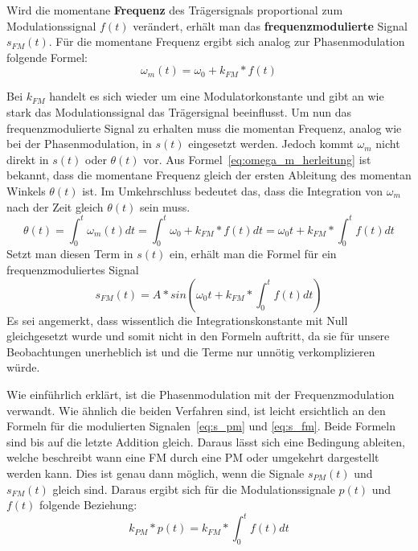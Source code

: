 Wird die momentane \textbf{Frequenz} des Trägersignals proportional zum Modulationssignal \(f(t)\) verändert, erhält man das \textbf{frequenzmodulierte} Signal \(s_{FM}(t)\). \cite[S. 210]{lathi} Für die momentane Frequenz ergibt sich analog zur Phasenmodulation folgende Formel:
\begin{equation}
\omega_m(t)=\omega_0+k_{FM}*f(t)
\label{eq:omega_m}
\end{equation}

Bei \(k_{FM}\) handelt es sich wieder um eine Modulatorkonstante und gibt an wie stark das Modulationssignal das Trägersignal beeinflusst. Um nun das frequenzmodulierte Signal zu erhalten muss die momentan Frequenz, analog wie bei der Phasenmodulation, in \(s(t)\) eingesetzt werden. Jedoch kommt \(\omega_m\) nicht direkt in \(s(t)\) oder \(\theta(t)\) vor. Aus Formel~\ref{eq:omega_m_herleitung} ist bekannt, dass die momentane Frequenz gleich der ersten Ableitung des momentan Winkels \(\theta(t)\) ist. Im Umkehrschluss bedeutet das, dass die Integration von \(\omega_m\) nach der Zeit gleich \(\theta(t)\) sein muss.
\begin{equation*}
\theta(t)=\int_0^t{\omega_m(t)} dt = \int_0^t{\omega_0 + k_{FM}*f(t)} dt = \omega_0t + k_{FM} * \int_0^t{f(t)} dt
\end{equation*}
Setzt man diesen Term in \(s(t)\) ein, erhält man die Formel für ein frequenzmoduliertes Signal
\begin{equation}
s_{FM}(t)=A*sin(\omega_0t + k_{FM} * \int_0^t{f(t)} dt)
\label{eq:s_fm}
\end{equation}
Es sei angemerkt, dass wissentlich die Integrationskonstante mit Null gleichgesetzt wurde und somit nicht in den Formeln auftritt, da sie für unsere Beobachtungen unerheblich ist und die Terme nur unnötig verkomplizieren würde.

Wie einführlich erklärt, ist die Phasenmodulation mit der Frequenzmodulation verwandt. Wie ähnlich die beiden Verfahren sind, ist leicht ersichtlich an den Formeln für die modulierten Signalen~\ref{eq:s_pm} und \ref{eq:s_fm}. Beide Formeln sind bis auf die letzte Addition gleich. Daraus lässt sich eine Bedingung ableiten, welche beschreibt wann eine FM durch eine PM oder umgekehrt dargestellt werden kann. Dies ist genau dann möglich, wenn die Signale \(s_{PM}(t)\) und \(s_{FM}(t)\) gleich sind. Daraus ergibt sich für die Modulationssignale \(p(t)\) und \(f(t)\) folgende Beziehung:
\begin{equation}
k_{PM}*p(t)=k_{FM} * \int_0^t{f(t)} dt
\end{equation}

